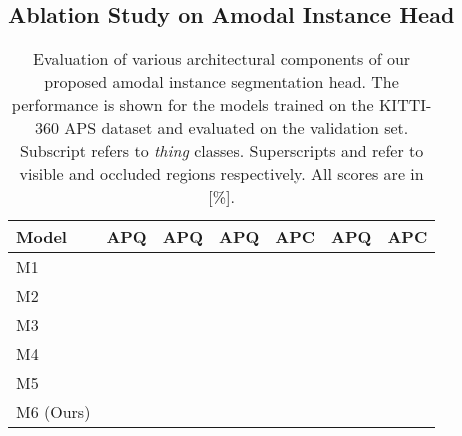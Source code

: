 \documentclass[10pt,twocolumn,letterpaper]{article}
\begin{document}
\subsection{Ablation Study on Amodal Instance Head}
\label{sec:aih}

\begin{table}
\footnotesize 
\centering
\begin{tabular}{p{2.0cm}|p{0.5cm}p{0.5cm}p{0.5cm}p{0.5cm}p{0.5cm}p{0.5cm}}
\toprule
Model &  APQ&  APQ &  APQ & APC& APQ & APC \\
\midrule
M1  & &  & &   & &    \\
M2  & &  & &   & &    \\
M3  &  &  & &   & &   \\
M4  & &  & &   & &    \\
M5  & &  & &   & &    \\
M6 (Ours)  & &  & &   & &    \\
\bottomrule
\end{tabular}
\vspace{-0.2cm}
\caption{Evaluation of various architectural components of our proposed amodal instance segmentation head. The performance is shown for the models trained on the KITTI-360 APS dataset and evaluated on the validation set. Subscript  refers to \textit{thing} classes. Superscripts  and  refer to visible and occluded regions respectively. All scores are in [\%].}
\label{tab:instanceHeadEvaluation}
\vspace{-0.4cm}
\end{table}
\end{document}
